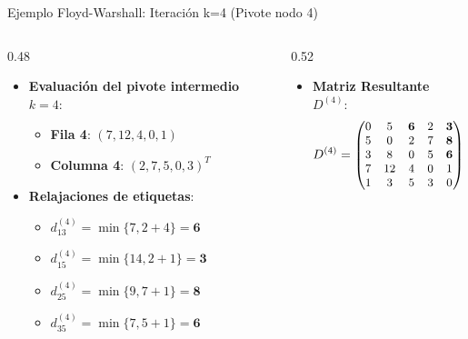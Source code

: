 \documentclass[
  ignorenonframetext,
]{beamer}
\providecommand{\tightlist}{%
  \setlength{\itemsep}{0pt}\setlength{\parskip}{0pt}}
\begin{document}
\begin{frame}{Ejemplo Floyd-Warshall: Iteración k=4 (Pivote nodo 4)}
\label{ejemplo-floyd-warshall-iteraciuxf3n-k4-pivote-nodo-4}
\begin{columns}[T]
\begin{column}{0.48\linewidth}
\begin{itemize}
\tightlist
\item
  \textbf{Evaluación del pivote intermedio \(k=4\)}:

  \begin{itemize}
  \tightlist
  \item
    \textbf{Fila 4}: \((7, 12, 4, 0, 1)\)
  \item
    \textbf{Columna 4}: \((2, 7, 5, 0, 3)^T\)
  \end{itemize}
\item
  \textbf{Relajaciones de etiquetas}:

  \begin{itemize}
  \tightlist
  \item
    \(d_{13}^{(4)} = \min \{7, 2 + 4\} = \mathbf{6}\)
  \item
    \(d_{15}^{(4)} = \min \{14, 2 + 1\} = \mathbf{3}\)
  \item
    \(d_{25}^{(4)} = \min \{9, 7 + 1\} = \mathbf{8}\)
  \item
    \(d_{35}^{(4)} = \min \{7, 5 + 1\} = \mathbf{6}\)
  \end{itemize}
\end{itemize}
\end{column}

\begin{column}{0.52\linewidth}
\begin{itemize}
\tightlist
\item
  \textbf{Matriz Resultante \(D^{(4)}\)}: \[ \small
  D^{(4)} = \begin{pmatrix}
  0 & 5 & \mathbf{6} & 2 & \mathbf{3} \\
  5 & 0 & 2 & 7 & \mathbf{8} \\
  3 & 8 & 0 & 5 & \mathbf{6} \\
  7 & 12 & 4 & 0 & 1 \\
  1 & 3 & 5 & 3 & 0
  \end{pmatrix}
  \]
\end{itemize}
\end{column}
\end{columns}
\end{frame}
\end{document}
